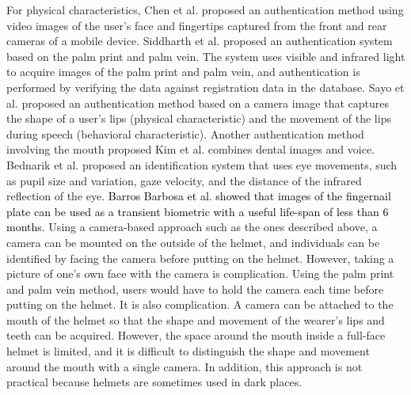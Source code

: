 \documentclass[english,preprint,JIP]{ipsj}
\begin{document}
For physical characteristics, Chen et al.\cite{face_and_finger} proposed an authentication method using video images of the user's face and fingertips captured from the front and rear cameras of a mobile device. Siddharth et al.\cite{palm_print} proposed an authentication system based on the palm print and palm vein. The system uses visible and infrared light to acquire images of the palm print and palm vein, and authentication is performed by verifying the data against registration data in the database. Sayo et al.\cite{lip_motion} proposed an authentication method based on a camera image that captures the shape of a user's lips (physical characteristic) and the movement of the lips during speech (behavioral characteristic). Another authentication method involving the mouth proposed Kim et al.\cite{teeth_and_voice} combines dental images and voice. Bednarik et al.\cite{eye_movement} proposed an identification system that uses eye movements, such as pupil size and variation, gaze velocity, and the distance of the infrared reflection of the eye. \textcolor{black}{Barros Barbosa et al.\cite{nail_auth} showed that images of the fingernail plate can be used as a transient biometric with a useful life-span of less than 6 months.} Using a camera-based approach such as the ones described above, a camera can be mounted on the outside of the helmet, and individuals can be identified by facing the camera before putting on the helmet. However, taking a picture of one's own face with the camera is complication. Using the palm print and palm vein method, users would have to hold the camera each time before putting on the helmet. It is also complication. A camera can be attached to the mouth of the helmet so that the shape and movement of the wearer's lips and teeth can be acquired. However, the space around the mouth inside a full-face helmet is limited, and it is difficult to distinguish the shape and movement around the mouth with a single camera. In addition, this approach is not practical because helmets are sometimes used in dark places.\par
\end{document}
